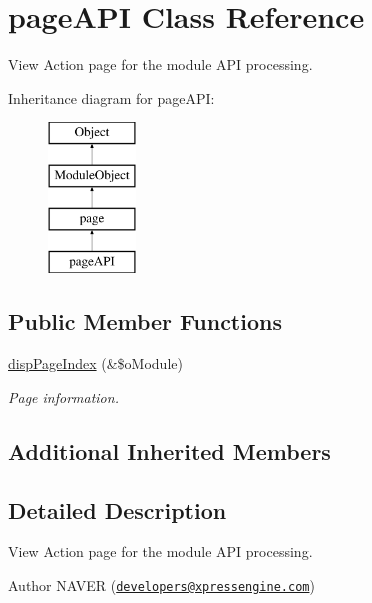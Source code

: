 \hypertarget{classpageAPI}{\section{page\+A\+P\+I Class Reference}
\label{classpageAPI}
}


View Action page for the module A\+P\+I processing.  


Inheritance diagram for page\+A\+P\+I\+:\begin{figure}[H]
\begin{center}
\leavevmode
\includegraphics[height=4.000000cm]{classpageAPI}
\end{center}
\end{figure}
\subsection*{Public Member Functions}
\begin{DoxyCompactItemize}
\item 
\hyperlink{classpageAPI_a75a866f5715bbd74bdd977676027cd20}{disp\+Page\+Index} (\&\$o\+Module)
\begin{DoxyCompactList}\small\item\em Page information. \end{DoxyCompactList}\end{DoxyCompactItemize}
\subsection*{Additional Inherited Members}


\subsection{Detailed Description}
View Action page for the module A\+P\+I processing. 

\begin{DoxyAuthor}{Author}
N\+A\+V\+E\+R (\href{mailto:developers@xpressengine.com}{\tt developers@xpressengine.\+com}) 
\end{DoxyAuthor}


